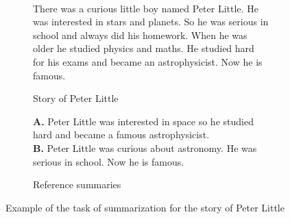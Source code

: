 \begin{figure}[H]\
\begin{subfigure}{\textwidth}
\begin{displayquote}
There was a curious little boy named Peter Little. He was interested in stars and planets. So he was serious in school and always did his homework. When he was older he studied physics and maths. He studied hard for his exams and became an astrophysicist. Now he is famous.
\end{displayquote}
\caption{Story of Peter Little}
\vspace{\baselineskip}
\end{subfigure}
\begin{subfigure}{\textwidth}
\begin{displayquote}
\textbf{A.} Peter Little was interested in space so he studied hard and became a famous astrophysicist.\\
\textbf{B.} Peter Little was curious about astronomy. He was serious in school. Now he is famous.\\
\caption{Reference summaries}
\end{displayquote}
\end{subfigure}
\caption{Example of the task of summarization for the story of Peter Little}
\label{fig:peter_little}
\end{figure}